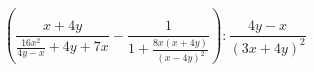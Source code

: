 \begin{ex}[type=expression]
	\begin{condition}
		\( \left( \dfrac{x+4y}{\frac{16x^2}{4y-x}+4y+7x} -\dfrac{1}{1+\frac{8x(x+4y)}{(x-4y)^2}}\right):\dfrac{4y-x}{(3x+4y)^2} \)
	\end{condition}
\end{ex}